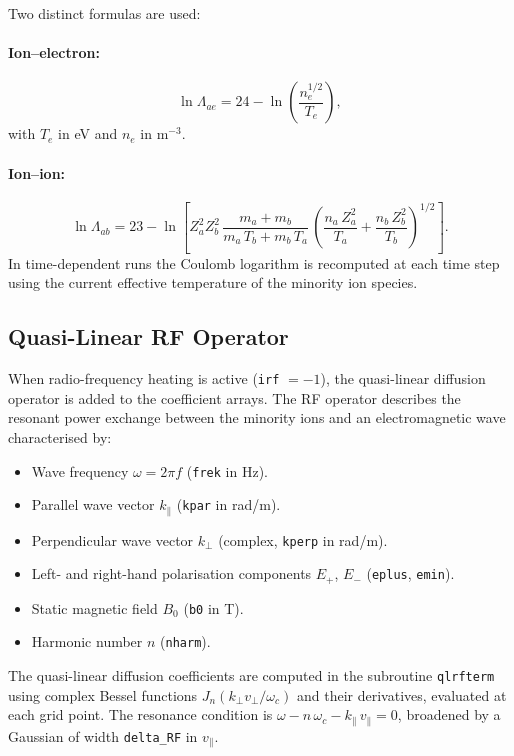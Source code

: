 \documentclass[11pt,a4paper]{article}
\newcommand{\vp}{v_\perp}
\newcommand{\vpa}{v_\parallel}
\begin{document}
Two distinct formulas are used:

\paragraph{Ion--electron:}
\begin{equation}
  \ln\Lambda_{ae} = 24 - \ln\!\left(\frac{n_e^{1/2}}{T_e}\right),
\end{equation}
with $T_e$ in eV and $n_e$ in m$^{-3}$.

\paragraph{Ion--ion:}
\begin{equation}
  \ln\Lambda_{ab} = 23 - \ln\!\left[
    Z_a^2 Z_b^2\,\frac{m_a+m_b}{m_a\,T_b + m_b\,T_a}\,
    \left(\frac{n_a\,Z_a^2}{T_a}+\frac{n_b\,Z_b^2}{T_b}\right)^{1/2}
  \right].
\end{equation}
In time-dependent runs the Coulomb logarithm is recomputed at each time step
using the current effective temperature of the minority ion species.

\subsection{Quasi-Linear RF Operator}

When radio-frequency heating is active (\texttt{irf} $= -1$), the
quasi-linear diffusion operator is added to the coefficient arrays.  The RF
operator describes the resonant power exchange between the minority ions and
an electromagnetic wave characterised by:
\begin{itemize}
  \item Wave frequency $\omega = 2\pi f$ (\texttt{frek} in Hz).
  \item Parallel wave vector $k_\parallel$ (\texttt{kpar} in rad/m).
  \item Perpendicular wave vector $k_\perp$ (complex, \texttt{kperp}
        in rad/m).
  \item Left- and right-hand polarisation components $E_+$, $E_-$
        (\texttt{eplus}, \texttt{emin}).
  \item Static magnetic field $B_0$ (\texttt{b0} in T).
  \item Harmonic number $n$ (\texttt{nharm}).
\end{itemize}

The quasi-linear diffusion coefficients are computed in the subroutine
\texttt{qlrfterm} using complex Bessel functions $J_n(k_\perp \vp / \omega_c)$
and their derivatives, evaluated at each grid point.  The resonance condition
is $\omega - n\,\omega_c - k_\parallel\,\vpa = 0$, broadened by a Gaussian
of width \texttt{delta\_RF} in $\vpa$.
\end{document}
